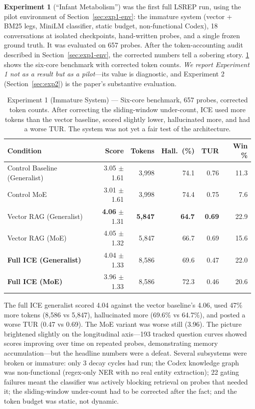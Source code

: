 \documentclass[11pt,a4paper]{article}
\begin{document}
\textbf{Experiment 1} (``Infant Metabolism'') was the first full LSREP run, using the pilot environment of Section~\ref{sec:exp1-env}: the immature system (vector + BM25 legs, MiniLM classifier, static budget, non-functional Codex), 18 conversations at isolated checkpoints, hand-written probes, and a single frozen ground truth. It was evaluated on 657 probes. After the token-accounting audit described in Section~\ref{sec:exp1-env}, the corrected numbers tell a sobering story. \cref{tab:exp1} shows the six-core benchmark with corrected token counts. \emph{We report Experiment 1 not as a result but as a pilot}---its value is diagnostic, and Experiment 2 (Section~\ref{sec:exp2}) is the paper's substantive evaluation.

\begin{table}[htbp]
\centering
\small
\caption{Experiment 1 (Immature System) --- Six-core benchmark, 657 probes, corrected token counts. After correcting the sliding-window under-count, ICE used more tokens than the vector baseline, scored slightly lower, hallucinated more, and had a worse TUR. The system was not yet a fair test of the architecture.}
\label{tab:exp1}
\begin{tabular}{@{}lrrrrr@{}}
\toprule
\textbf{Condition} & \textbf{Score} & \textbf{Tokens} & \textbf{Hall.\ (\%)} & \textbf{TUR} & \textbf{Win \%} \\
\midrule
Control Baseline (Generalist) & 3.05 $\pm$ 1.61 & 3{,}998  & 74.1 & 0.76 & 11.3 \\
Control MoE                   & 3.01 $\pm$ 1.61 & 3{,}998  & 74.4 & 0.75 & 7.6  \\
Vector RAG (Generalist)       & \textbf{4.06} $\pm$ 1.31 & \textbf{5{,}847}  & \textbf{64.7} & \textbf{0.69} & 22.9 \\
Vector RAG (MoE)              & 4.05 $\pm$ 1.32 & 5{,}847  & 66.7 & 0.69 & 15.6 \\
\textbf{Full ICE (Generalist)}& 4.04 $\pm$ 1.33 & 8{,}586  & 69.6 & 0.47 & 22.0 \\
\textbf{Full ICE (MoE)}       & 3.96 $\pm$ 1.33 & 8{,}586  & 72.3 & 0.46 & 20.6 \\
\bottomrule
\end{tabular}
\end{table}

The full ICE generalist scored 4.04 against the vector baseline's 4.06, used 47\% more tokens (8{,}586 vs 5{,}847), hallucinated more (69.6\% vs 64.7\%), and posted a worse TUR (0.47 vs 0.69). The MoE variant was worse still (3.96). The picture brightened slightly on the longitudinal axis---193 tracked question curves showed scores improving over time on repeated probes, demonstrating memory accumulation---but the headline numbers were a defeat. Several subsystems were broken or immature: only 3 decay cycles had run; the Codex knowledge graph was non-functional (regex-only NER with no real entity extraction); 22 gating failures meant the classifier was actively blocking retrieval on probes that needed it; the sliding-window under-count had to be corrected after the fact; and the token budget was static, not dynamic.
\end{document}
